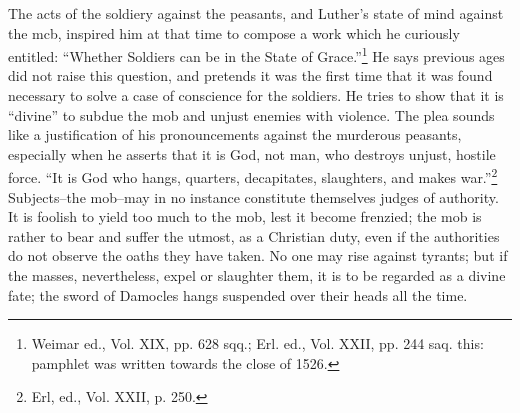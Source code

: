 The acts of the soldiery against the peasants, and Luther’s state of mind
against the mcb, inspired him at that time to compose a work which he
curiously entitled: “Whether Soldiers can be in the State of Grace.”\footnote
{Weimar ed., Vol. XIX, pp. 628 sqq.; Erl. ed., Vol. XXII, pp. 244 saq. this: pamphlet
was written towards the close of 1526.}
He says previous ages did not raise this question, and pretends it was the first
time that it was found necessary to solve a case of conscience for
the soldiers. He tries to show that it is “divine” to subdue the mob and unjust
enemies with violence. The plea sounds like a justification of his pronouncements
against the murderous peasants, especially when he asserts that
it is God, not man, who destroys unjust, hostile force. “It is God who hangs,
quarters, decapitates, slaughters, and makes war.”\footnote{Erl, ed., Vol. XXII, p. 250.}
Subjects--the mob--may in no instance constitute themselves judges of authority. It is foolish to
yield too much to the mob, lest it become frenzied; the mob is rather to bear
and suffer the utmost, as a Christian duty, even if the authorities do
not observe the oaths they have taken. No one may rise against tyrants; but if the
masses, nevertheless, expel or slaughter them, it is to be regarded as a divine
fate; the sword of Damocles hangs suspended over their heads all the time.
